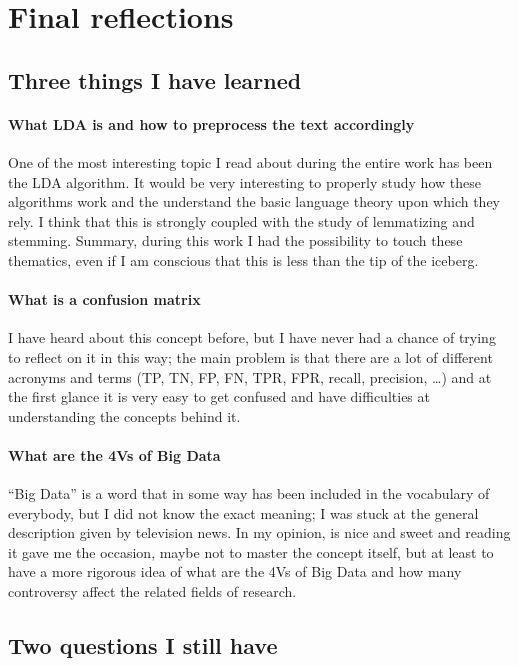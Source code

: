 \documentclass[a4paper]{article}
\begin{document}
		
		\section{Final reflections}
			\subsection{Three things I have learned}
				\paragraph{What LDA is and how to preprocess the text accordingly} One of the most interesting topic I read about during the entire work has been the LDA algorithm. It would be very interesting to properly study how these algorithms work and the understand the basic language theory upon which they rely. I think that this is strongly coupled with the study of lemmatizing and stemming. Summary, during this work I had the possibility to touch these thematics, even if I am conscious that this is less than the tip of the iceberg.
			
				\paragraph{What is a confusion matrix}
				I have heard about this concept before, but I have never had a chance of trying to reflect on it in this way; the main problem is that there are a lot of different acronyms and terms (TP, TN, FP, FN, TPR, FPR, recall, precision, \dots) and at the first glance it is very easy to get confused and have difficulties at understanding the concepts behind it. 
				
				\paragraph{What are the 4Vs of Big Data} ``Big Data'' is a word that in some way has been included in the vocabulary of everybody, but I did not know the exact meaning; I was stuck at the general description given by television news. In my opinion, \cite{article:muller} is nice and sweet and reading it gave me the occasion, maybe not to master the concept itself, but at least to have a more rigorous idea of what are the 4Vs of Big Data and how many controversy affect the related fields of research.
				
			\subsection{Two questions I still have}
\end{document}
